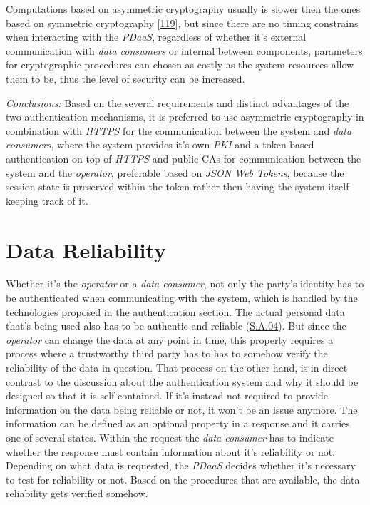 \documentclass[12pt,english,a4paper,titlepage,cleardoublepage=empty,dottedtoc]{report}
\begin{document}
Computations based on asymmetric cryptography usually is slower then the
ones based on symmetric cryptography
{[}\protect\hyperlink{ref-book_2014_chapter-10-5-asym-random-number-gen}{119}{]},
but since there are no timing constrains when interacting with the
\emph{PDaaS}, regardless of whether it's external communication with
\emph{data consumers} or internal between components, parameters for
cryptographic procedures can chosen as costly as the system resources
allow them to be, thus the level of security can be increased.

\emph{Conclusions:} Based on the several requirements and distinct
advantages of the two authentication mechanisms, it is preferred to use
asymmetric cryptography in combination with \emph{HTTPS} for the
communication between the system and \emph{data consumers}, where the
system provides it's own \emph{PKI} and a token-based authentication on
top of \emph{HTTPS} and public CAs for communication between the system
and the \emph{operator}, preferable based on
\emph{\protect\hyperlink{link_jwt}{JSON Web Tokens}}, because the
session state is preserved within the token rather then having the
system itself keeping track of it.

\section{Data Reliability}\label{data-reliability}

Whether it's the \emph{operator} or a \emph{data consumer}, not only the
party's identity has to be authenticated when communicating with the
system, which is handled by the technologies proposed in the
\protect\hyperlink{authentication}{authentication} section. The actual
personal data that's being used also has to be authentic and reliable
(\protect\hyperlink{sa04}{S.A.04}). But since the \emph{operator} can
change the data at any point in time, this property requires a process
where a trustworthy third party has to has to somehow verify the
reliability of the data in question. That process on the other hand, is
in direct contrast to the discussion about the
\protect\hyperlink{authentication}{authentication system} and why it
should be designed so that it is self-contained. If it's instead not
required to provide information on the data being reliable or not, it
won't be an issue anymore. The information can be defined as an optional
property in a response and it carries one of several states. Within the
request the \emph{data consumer} has to indicate whether the response
must contain information about it's reliability or not. Depending on
what data is requested, the \emph{PDaaS} decides whether it's necessary
to test for reliability or not. Based on the procedures that are
available, the data reliability gets verified somehow.
\end{document}
